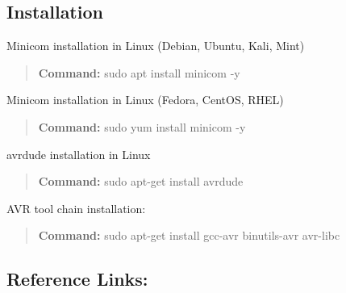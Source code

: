 \subsection*{Installation}


\begin{DoxyItemize}
\item Minicom installation in Linux (Debian, Ubuntu, Kali, Mint) \begin{quote}
{\bfseries Command\+:} sudo apt install minicom -\/y \end{quote}

\item Minicom installation in Linux (Fedora, Cent\+OS, R\+H\+EL) \begin{quote}
{\bfseries Command\+:} sudo yum install minicom -\/y \end{quote}

\item avrdude installation in Linux \begin{quote}
{\bfseries Command\+:} sudo apt-\/get install avrdude \end{quote}

\item A\+VR tool chain installation\+: \begin{quote}
{\bfseries Command\+:} sudo apt-\/get install gcc-\/avr binutils-\/avr avr-\/libc \end{quote}

\end{DoxyItemize}

\subsection*{Reference Links\+:}



